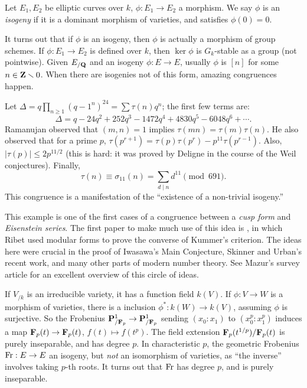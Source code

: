 \begin{definition}
Let $E_1,E_2$ be elliptic curves over $k$, $\phi:E_1\to E_2$ a morphism. We say 
$\phi$ is an \emph{isogeny} if it is a dominant morphism of varieties, and 
satisfies $\phi(0)=0$. 
\end{definition}

It turns out that if $\phi$ is an isogeny, then $\phi$ is actually a morphism 
of group schemes. 
If $\phi:E_1\to E_2$ is defined over $k$, then $\ker\phi$ is $G_k$-stable as a 
group (not pointwise). Given $E_{/\mathbf{Q}}$ and an isogeny $\phi:E\to E$, usually 
$\phi$ is $[n]$ for some $n\in\mathbf{Z}\smallsetminus 0$. 
When there are isogenies not of this form, amazing congruences happen. 

\begin{example}
Let $\Delta=q \prod_{n\geqslant 1} (q-1^n)^{24} = \sum \tau(n) q^n$; the first 
few terms are: 
\[
  \Delta = q-24 q^2 + 252 q^3 - 1472 q^4 + 4830 q^5 - 6048 q^6 + \cdots .
\]
Ramanujan observed that $(m,n)=1$ implies $\tau(m n) = \tau(m) \tau(n)$. He 
also observed that for a prime $p$, 
$\tau(p^{r+1}) = \tau(p) \tau(p^r) - p^{11} \tau(p^{r-1})$. Also, 
$|\tau(p)|\leqslant 2 p^{11/2}$ (this is hard: it was proved by Deligne in the 
course of the Weil conjectures). Finally, 
\[
  \tau(n) \equiv \sigma_{11}(n) = \sum_{d\mid n} d^{11} \pmod{691} .
\]
This congruence is a manifestation of the ``existence of a non-trivial 
isogeny.'' 
\end{example}

This example is one of the first cases of a congruence between a \emph{cusp 
form} and \emph{Eisenstein series}. The first paper to make much use of this 
idea is \cite{ribet-1976}, in which Ribet used modular forms to prove the 
converse of Kummer's criterion. The ideas here were crucial in the proof of 
Iwasawa's Main Conjecture, Skinner and Urban's recent work, and many other 
parts of modern number theory. See Mazur's survey article 
\cite{mazur-2011} for an excellent overview of this circle of ideas. 

If $V_{/k}$ is an irreducible variety, it has a function field $k(V)$. If 
$\phi:V\to W$ is a morphism of varieties, there is a inclusion 
$\phi^\ast:k(W)\to k(V)$, assuming $\phi$ is surjective. So the Frobenius 
$\mathbf{P}_{/\mathbf{F}_p}^1\to \mathbf{P}_{/\mathbf{F}_p}^1$ sending $(x_0:x_1)$ to 
$(x_0^p:x_1^p)$ induces a map 
$\mathbf{F}_p(t)\to \mathbf{F}_p(t)$, $f(t)\mapsto f(t^p)$. The field extension 
$\mathbf{F}_p(t^{1/p})/\mathbf{F}_p(t)$ is purely inseparable, and has degree $p$. In 
characteristic $p$, the geometric Frobenius $\operatorname{Fr}:E\to E$ an isogeny, but 
\emph{not} an isomorphism of varieties, as ``the inverse'' involves taking 
$p$-th roots. It turns out that $\operatorname{Fr}$ has degree $p$, and is purely 
inseparable. 

